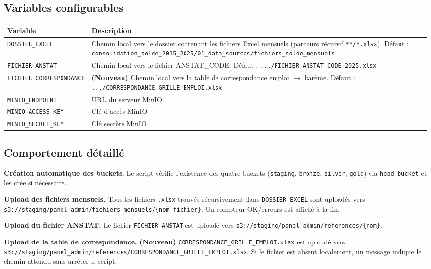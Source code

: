 \documentclass[12pt,a4paper,french]{report}
\newcommand{\bucket}[1]{\texttt{s3://#1}}
\begin{document}
\subsection{Variables configurables}

\begin{tabularx}{\textwidth}{lX}
  \toprule
  \textbf{Variable} & \textbf{Description} \\
  \midrule
  \texttt{DOSSIER\_EXCEL} &
    Chemin local vers le dossier contenant les fichiers Excel mensuels
    (parcours récursif \texttt{**/*.xlsx}).
    Défaut : \texttt{consolidation\_solde\_2015\_2025/01\_data\_sources/fichiers\_solde\_mensuels} \\
  \texttt{FICHIER\_ANSTAT} &
    Chemin local vers le fichier ANSTAT\_CODE.
    Défaut : \texttt{.../FICHIER\_ANSTAT\_CODE\_2025.xlsx} \\
  \texttt{FICHIER\_CORRESPONDANCE} &
    \textbf{(Nouveau)} Chemin local vers la table de correspondance
    emploi $\rightarrow$ barème.
    Défaut : \texttt{.../CORRESPONDANCE\_GRILLE\_EMPLOI.xlsx} \\
  \texttt{MINIO\_ENDPOINT} & URL du serveur MinIO \\
  \texttt{MINIO\_ACCESS\_KEY} & Clé d'accès MinIO \\
  \texttt{MINIO\_SECRET\_KEY} & Clé secrète MinIO \\
  \bottomrule
\end{tabularx}

\subsection{Comportement détaillé}

\textbf{Création automatique des buckets.} Le script vérifie l'existence des
quatre buckets (\texttt{staging}, \texttt{bronze}, \texttt{silver},
\texttt{gold}) via \texttt{head\_bucket} et les crée si nécessaire.

\textbf{Upload des fichiers mensuels.} Tous les fichiers \texttt{.xlsx}
trouvés récursivement dans \texttt{DOSSIER\_EXCEL} sont uploadés vers
\bucket{staging/panel\_admin/fichiers\_mensuels/\{nom\_fichier\}}.
Un compteur OK/erreurs est affiché à la fin.

\textbf{Upload du fichier ANSTAT.} Le fichier \texttt{FICHIER\_ANSTAT} est
uploadé vers \bucket{staging/panel\_admin/references/\{nom\}}.

\textbf{Upload de la table de correspondance.} \textbf{(Nouveau)}
\texttt{CORRESPONDANCE\_GRILLE\_EMPLOI.xlsx} est uploadé vers
\bucket{staging/panel\_admin/references/CORRESPONDANCE\_GRILLE\_EMPLOI.xlsx}.
Si le fichier est absent localement, un message indique le chemin attendu
sans arrêter le script.
\end{document}
